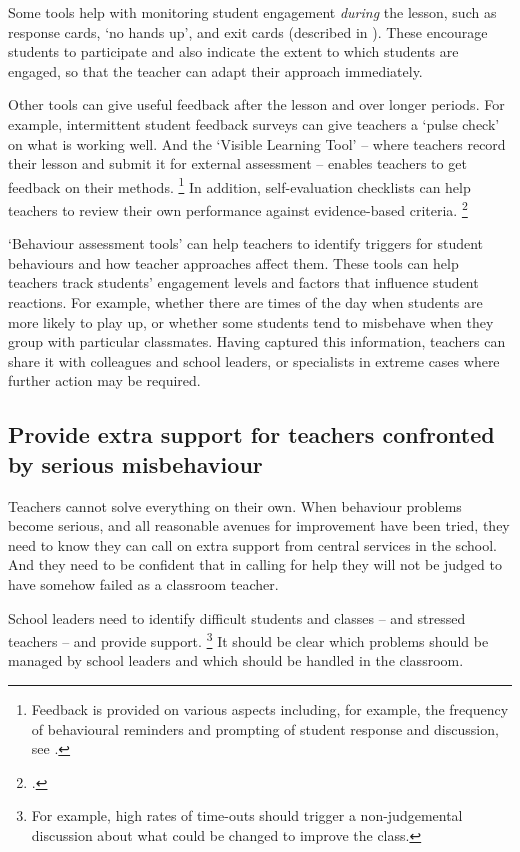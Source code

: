\documentclass{grattan}
\begin{document}
Some tools help with monitoring student engagement \emph{during} the lesson, such as response cards, `no hands up', and exit cards (described in ). These encourage students to participate and also indicate the extent to which students are engaged, so that the teacher can adapt their approach immediately.

Other tools can give useful feedback after the lesson and over longer periods. For example, intermittent student feedback surveys can give teachers a `pulse check' on what is working well. And the `Visible Learning Tool' -- where teachers record their lesson and submit it for external assessment -- enables teachers to get feedback on their methods.%
    \footnote{Feedback is provided on various aspects including, for example, the frequency of behavioural reminders and prompting of student response and discussion, see \emph{\textcite{VisibleClassroom2015}}.}
In addition, self-evaluation checklists can help teachers to review their own performance against evidence-based criteria.%
    \footcite{Simonsen2008EvidenceBasedPractices}

`Behaviour assessment tools' can help teachers to identify triggers for student behaviours and how teacher approaches affect them. These tools can help teachers track students' engagement levels and factors that influence student reactions. For example, whether there are times of the day when students are more likely to play up, or whether some students tend to misbehave when they group with particular classmates. Having captured this information, teachers can share it with colleagues and school leaders, or specialists in extreme cases where further action may be required.

\subsection{Provide extra support for teachers confronted by serious misbehaviour}\label{subsubsec:provide-extra-support}
Teachers cannot solve everything on their own. When behaviour problems become serious, and all reasonable avenues for improvement have been tried, they need to know they can call on extra support from central services in the school. And they need to be confident that in calling for help they will not be judged to have somehow failed as a classroom teacher.

School leaders need to identify difficult students and classes -- and stressed teachers -- and provide support.%
    \footnote{For example, high rates of time-outs should trigger a non-judgemental discussion about what could be changed to improve the class.}
It should be clear which problems should be managed by school leaders and which should be handled in the classroom.
\end{document}
